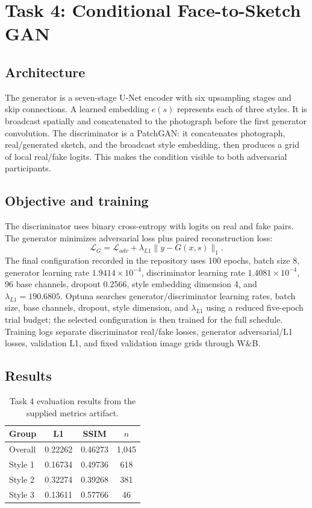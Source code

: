 \documentclass[conference]{IEEEtran}
\begin{document}
\section{Task 4: Conditional Face-to-Sketch GAN}
\subsection{Architecture}
The generator is a seven-stage U-Net encoder with six upsampling stages and skip connections. A learned embedding $e(s)$ represents each of three styles. It is broadcast spatially and concatenated to the photograph before the first generator convolution. The discriminator is a PatchGAN: it concatenates photograph, real/generated sketch, and the broadcast style embedding, then produces a grid of local real/fake logits. This makes the condition visible to both adversarial participants.

\subsection{Objective and training}
The discriminator uses binary cross-entropy with logits on real and fake pairs. The generator minimizes adversarial loss plus paired reconstruction loss:
\begin{equation}
\mathcal{L}_G=\mathcal{L}_{adv}+\lambda_{L1}\|y-G(x,s)\|_1.
\end{equation}
The final configuration recorded in the repository uses 100 epochs, batch size 8, generator learning rate $1.9414\times10^{-4}$, discriminator learning rate $1.4081\times10^{-4}$, 96 base channels, dropout 0.2566, style embedding dimension 4, and $\lambda_{L1}=190.6805$. Optuna searches generator/discriminator learning rates, batch size, base channels, dropout, style dimension, and $\lambda_{L1}$ using a reduced five-epoch trial budget; the selected configuration is then trained for the full schedule. Training logs separate discriminator real/fake losses, generator adversarial/L1 losses, validation L1, and fixed validation image grids through W\&B.

\subsection{Results}
\begin{table}[t]
\caption{Task 4 evaluation results from the supplied metrics artifact.}
\label{tab:task4}
\centering
\begin{tabular}{lccc}
\toprule
Group & L1 & SSIM & $n$\\
\midrule
Overall & 0.22262 & 0.46273 & 1,045\\
Style 1 & 0.16734 & 0.49736 & 618\\
Style 2 & 0.32274 & 0.39268 & 381\\
Style 3 & 0.13611 & 0.57766 & 46\\
\bottomrule
\end{tabular}
\end{table}
\end{document}
